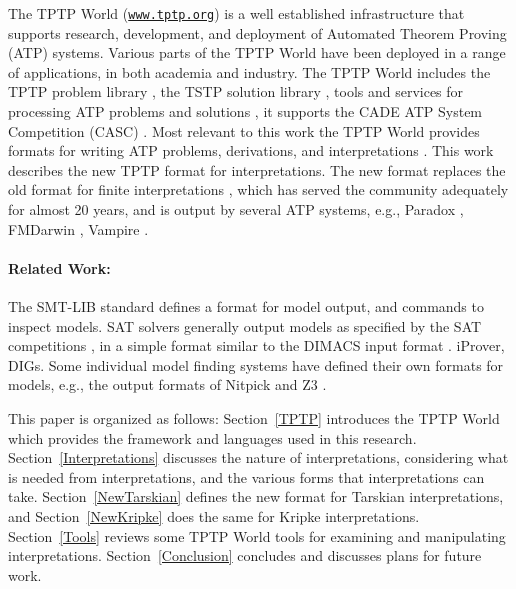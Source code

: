\documentclass{easychair}
\begin{document}
The TPTP World \cite{Sut17} (\href{https://www.tptp.org}{\tt www.tptp.org}) is a well established 
infrastructure that supports research, development, and deployment of Automated Theorem Proving 
(ATP) systems.
Various parts of the TPTP World have been deployed in a range of applications,
in both academia and industry.
The TPTP World includes the TPTP problem library \cite{Sut09}, 
the TSTP solution library \cite{Sut10}, 
tools and services for processing ATP problems and solutions \cite{Sut10}, 
it supports the CADE ATP System Competition (CASC) \cite{Sut16}.
Most relevant to this work the TPTP World provides formats for writing ATP problems, 
derivations, and interpretations \cite{SS+06,Sut08-KEAPPA}.
This work describes the new TPTP format for interpretations.
The new format replaces the old format for finite interpretations \cite{SS+06}, which has 
served the community adequately for almost 20 years, and is output by several ATP systems, e.g., 
Paradox \cite{CS03}, FMDarwin \cite{BF+06}, Vampire \cite{KV13}.

\paragraph{Related Work:}
The SMT-LIB standard \cite{BFT17} defines a format for model output, and commands to inspect 
models.  
SAT solvers generally output models as specified by the SAT competitions \cite{JL+12}, in a 
simple format similar to the DIMACS input format \cite{Bab93}.
iProver, DIGs.
Some individual model finding systems have defined their own formats for models, e.g., the 
output formats of Nitpick and Z3 \cite{dMB08}.

This paper is organized as follows:
Section~\ref{TPTP} introduces the TPTP World which provides the framework and languages used
in this research.
Section~\ref{Interpretations} discusses the nature of interpretations, considering what is
needed from interpretations, and the various forms that interpretations can take.
Section~\ref{NewTarskian} defines the new format for Tarskian interpretations, and
Section~\ref{NewKripke} does the same for Kripke interpretations.
Section~\ref{Tools} reviews some TPTP World tools for examining and manipulating interpretations.
Section~\ref{Conclusion} concludes and discusses plans for future work.
\end{document}
